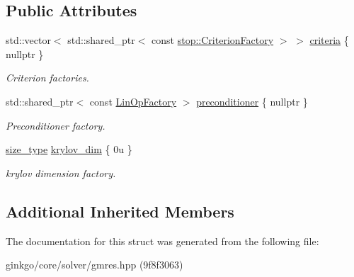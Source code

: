 \subsection*{Public Attributes}
\begin{DoxyCompactItemize}
\item 
\mbox{\label{structgko_1_1solver_1_1Gmres_1_1parameters__type_a7e00d428588b7bcac078083cb03c56c2}} 
std\+::vector$<$ std\+::shared\+\_\+ptr$<$ const \hyperlink{group__stop_gab12a51109c50b35ec36dc5a393d6a9a0}{stop\+::\+Criterion\+Factory} $>$ $>$ \hyperlink{structgko_1_1solver_1_1Gmres_1_1parameters__type_a7e00d428588b7bcac078083cb03c56c2}{criteria} \{ nullptr \}
\begin{DoxyCompactList}\small\item\em Criterion factories. \end{DoxyCompactList}\item 
\mbox{\label{structgko_1_1solver_1_1Gmres_1_1parameters__type_ae20afde8c9429953030e86efd37b0953}} 
std\+::shared\+\_\+ptr$<$ const \hyperlink{classgko_1_1LinOpFactory}{Lin\+Op\+Factory} $>$ \hyperlink{structgko_1_1solver_1_1Gmres_1_1parameters__type_ae20afde8c9429953030e86efd37b0953}{preconditioner} \{ nullptr \}
\begin{DoxyCompactList}\small\item\em Preconditioner factory. \end{DoxyCompactList}\item 
\mbox{\label{structgko_1_1solver_1_1Gmres_1_1parameters__type_a5b88f3758ea7c21c535041289e1b09ce}} 
\hyperlink{namespacegko_a6e5c95df0ae4e47aab2f604a22d98ee7}{size\+\_\+type} \hyperlink{structgko_1_1solver_1_1Gmres_1_1parameters__type_a5b88f3758ea7c21c535041289e1b09ce}{krylov\+\_\+dim} \{ 0u \}
\begin{DoxyCompactList}\small\item\em krylov dimension factory. \end{DoxyCompactList}\end{DoxyCompactItemize}
\subsection*{Additional Inherited Members}


The documentation for this struct was generated from the following file\+:\begin{DoxyCompactItemize}
\item 
ginkgo/core/solver/gmres.\+hpp (9f8f3063)\end{DoxyCompactItemize}
